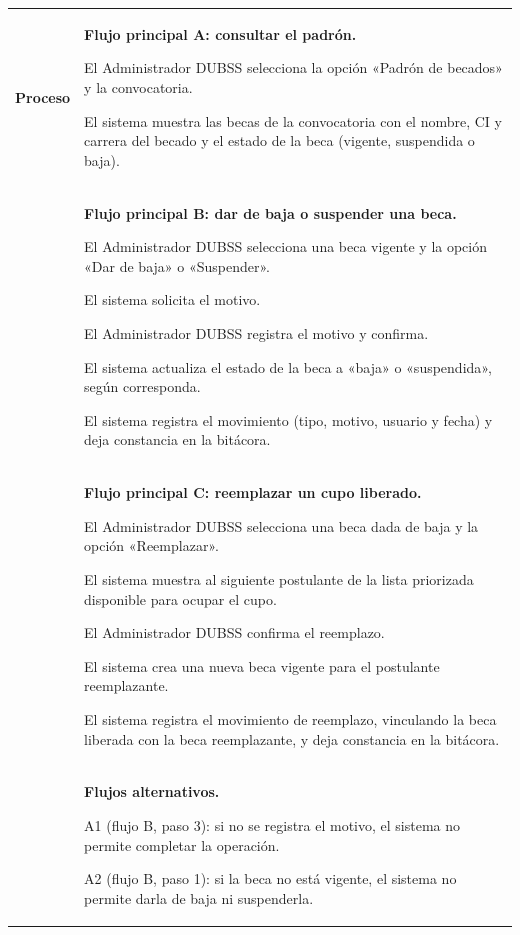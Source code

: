 \begin{longtable}{>{\raggedright\arraybackslash}p{2.9cm} >{\raggedright\arraybackslash}p{12.6cm}}
\midrule
\textbf{Proceso} & \textbf{Flujo principal A: consultar el padrón.}
\begin{cupasos}
    \item El Administrador DUBSS selecciona la opción «Padrón de becados» y la convocatoria.
    \item El sistema muestra las becas de la convocatoria con el nombre, CI y carrera del becado y el estado de la beca (vigente, suspendida o baja).
\end{cupasos} \\
 & \textbf{Flujo principal B: dar de baja o suspender una beca.}
\begin{cupasos}
    \item El Administrador DUBSS selecciona una beca vigente y la opción «Dar de baja» o «Suspender».
    \item El sistema solicita el motivo.
    \item El Administrador DUBSS registra el motivo y confirma.
    \item El sistema actualiza el estado de la beca a «baja» o «suspendida», según corresponda.
    \item El sistema registra el movimiento (tipo, motivo, usuario y fecha) y deja constancia en la bitácora.
\end{cupasos} \\
 & \textbf{Flujo principal C: reemplazar un cupo liberado.}
\begin{cupasos}
    \item El Administrador DUBSS selecciona una beca dada de baja y la opción «Reemplazar».
    \item El sistema muestra al siguiente postulante de la lista priorizada disponible para ocupar el cupo.
    \item El Administrador DUBSS confirma el reemplazo.
    \item El sistema crea una nueva beca vigente para el postulante reemplazante.
    \item El sistema registra el movimiento de reemplazo, vinculando la beca liberada con la beca reemplazante, y deja constancia en la bitácora.
\end{cupasos} \\
 & \textbf{Flujos alternativos.}
\begin{cuvin}
    \item A1 (flujo B, paso 3): si no se registra el motivo, el sistema no permite completar la operación.
    \item A2 (flujo B, paso 1): si la beca no está vigente, el sistema no permite darla de baja ni suspenderla.

\end{cuvin}
\end{longtable}
